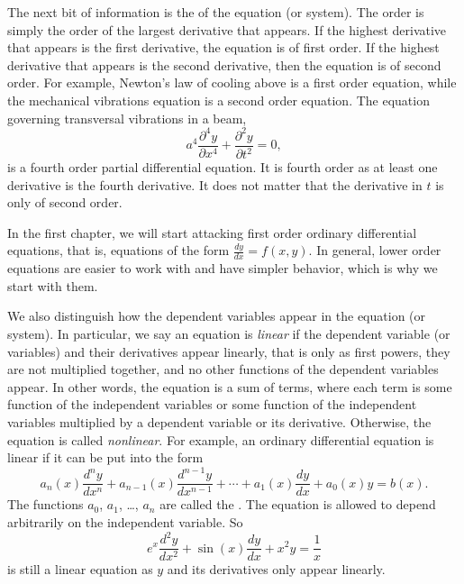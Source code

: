 \medskip

The next bit of information is the \emph{} of the
equation (or system).  The order is simply the order of the largest
derivative that appears.  If the highest derivative that appears is
the first derivative, the equation is of first order.  If the highest
derivative that appears is the second derivative, then the equation is of second
order.  For example, Newton's law of cooling above is a first order
equation, while the mechanical vibrations equation is a second order equation.
The equation governing transversal vibrations in a beam,
\begin{equation*}
a^4 \frac{\partial^4 y}{\partial x^4} + \frac{\partial^2 y}{\partial t^2} = 0,
\end{equation*}
is a fourth order partial differential equation.  It is
fourth order as at least one derivative is the fourth derivative.  It
does not matter that the derivative in $t$ is only of second order.

In the first chapter, we will start attacking first order ordinary
differential equations, that is, equations of the form $\frac{dy}{dx} = f(x,y)$.
In general, lower order equations are easier to work with and have simpler
behavior, which is why we start with them.

\medskip

We also distinguish how the dependent variables appear in the equation (or
system).  In particular, we say an equation is
\emph{linear} if the
dependent variable (or variables) and their derivatives appear linearly,
that is only as first powers, they are not multiplied together, and no other functions of the dependent
variables appear.  In other words, the equation is a sum of terms,
where each term is
some function of the independent variables
or 
some function of the independent variables
multiplied by a dependent variable
or its derivative.
Otherwise, the equation is called
\emph{nonlinear}.
For example,
an ordinary differential equation is linear if it can be
put into the form
\begin{equation} \label{classification:eqlingen}
a_n(x) \frac{d^n y}{dx^n} + 
a_{n-1}(x) \frac{d^{n-1} y}{dx^{n-1}} + 
\cdots
+
a_{1}(x) \frac{dy}{dx}
+
a_{0}(x) y = b(x) .
\end{equation}
The functions $a_0$, $a_1$, \ldots, $a_n$ are called the
\emph{}.
The equation is allowed to depend arbitrarily on the independent variable.
So 
\begin{equation} \label{classification:eqlinex}
e^x \frac{d^2 y}{dx^2} + 
\sin(x) \frac{d y}{dx} + 
x^2 y
=
\frac{1}{x}
\end{equation}
is still a linear equation as $y$ and its derivatives only appear linearly.

